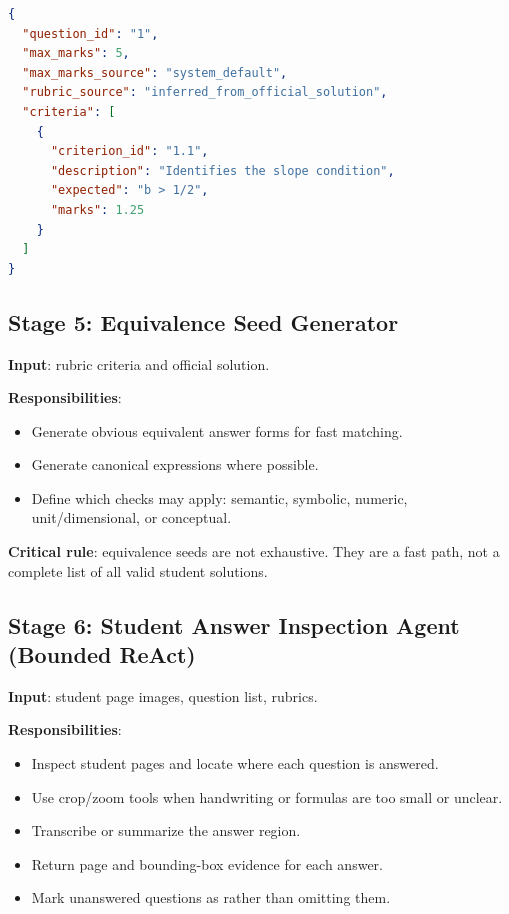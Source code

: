 \documentclass[11pt,a4paper]{article}
\newcommand{\code}[1]{\texttt{\detokenize{#1}}}
\begin{document}
\begin{lstlisting}[language=json]
{
  "question_id": "1",
  "max_marks": 5,
  "max_marks_source": "system_default",
  "rubric_source": "inferred_from_official_solution",
  "criteria": [
    {
      "criterion_id": "1.1",
      "description": "Identifies the slope condition",
      "expected": "b > 1/2",
      "marks": 1.25
    }
  ]
}
\end{lstlisting}

\subsection{Stage 5: Equivalence Seed Generator}

\textbf{Input}: rubric criteria and official solution.

\textbf{Responsibilities}:
\begin{itemize}[leftmargin=*]
  \item Generate obvious equivalent answer forms for fast matching.
  \item Generate canonical expressions where possible.
  \item Define which checks may apply: semantic, symbolic, numeric, unit/dimensional, or conceptual.
\end{itemize}

\textbf{Critical rule}: equivalence seeds are not exhaustive. They are a fast path, not a complete list of all valid student solutions.

\subsection{Stage 6: Student Answer Inspection Agent (Bounded ReAct)}

\textbf{Input}: student page images, question list, rubrics.

\textbf{Responsibilities}:
\begin{itemize}[leftmargin=*]
  \item Inspect student pages and locate where each question is answered.
  \item Use crop/zoom tools when handwriting or formulas are too small or unclear.
  \item Transcribe or summarize the answer region.
  \item Return page and bounding-box evidence for each answer.
  \item Mark unanswered questions as \code{missing} rather than omitting them.
\end{itemize}
\end{document}
